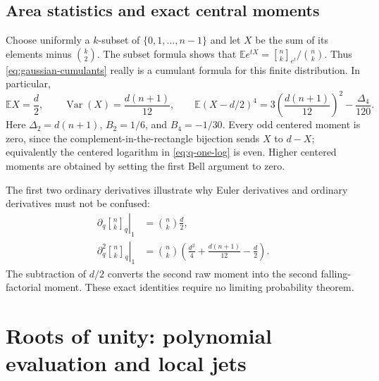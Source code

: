 \documentclass[11pt,a4paper]{article}
\numberwithin{equation}{section}
\theoremstyle{definition}
\theoremstyle{remark}
\newcommand{\G}[2]{\genfrac{[}{]}{0pt}{}{#1}{#2}_{q}}
\newcommand{\Gb}[3]{\genfrac{[}{]}{0pt}{}{#1}{#2}_{#3}}
\begin{document}
\subsection{Area statistics and exact central moments}
Choose uniformly a $k$-subset of $\{0,1,\ldots,n-1\}$ and let
$X$ be the sum of its elements minus $\binom k2$. The subset formula
shows that $\mathbb E e^{tX}=\Gb nk{e^t}/\binom nk$.
Thus \cref{eq:gaussian-cumulants} really is a cumulant formula for this
finite distribution. In particular,
\begin{equation}
 \mathbb E X=\frac d2,\qquad
 \operatorname{Var}(X)=\frac{d(n+1)}{12},\qquad
 \mathbb E(X-d/2)^4
     =3\left(\frac{d(n+1)}{12}\right)^2-\frac{\Delta_4}{120}.
 \label{eq:area-moments}
\end{equation}
Here $\Delta_2=d(n+1)$, $B_2=1/6$, and $B_4=-1/30$.
Every odd centered moment is zero, since the complement-in-the-rectangle
bijection sends $X$ to $d-X$; equivalently the centered logarithm in
\cref{eq:q-one-log} is even. Higher centered moments are obtained by
setting the first Bell argument to zero.

The first two ordinary derivatives illustrate why Euler derivatives
and ordinary derivatives must not be confused:
\begin{align}
 \left.\partial_q\G nk\right|_1&=\binom nk\frac d2,
 \label{eq:gaussian-first-q-one}\\
 \left.\partial_q^2\G nk\right|_1
   &=\binom nk\left(\frac{d^2}{4}
             +\frac{d(n+1)}{12}-\frac d2\right).
 \label{eq:gaussian-second-q-one}
\end{align}
The subtraction of $d/2$ converts the second raw moment into the second
falling-factorial moment. These exact identities require no limiting
probability theorem.

\section{Roots of unity: polynomial evaluation and local jets}
\label{sec:roots}
\end{document}
